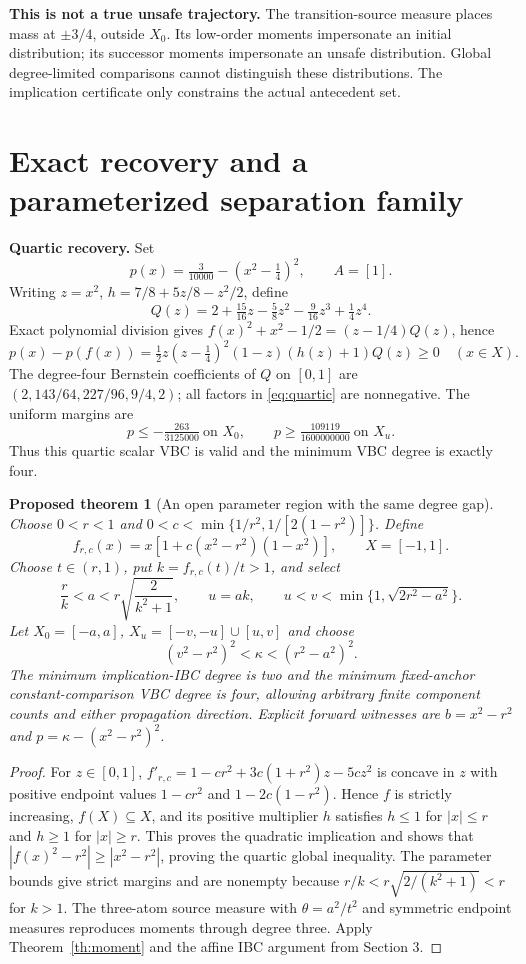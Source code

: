 \documentclass[10pt,letterpaper]{article}
\newtheorem{theorem}{Proposed theorem}
\begin{document}
\textbf{This is not a true unsafe trajectory.} The transition-source measure places mass at $\pm3/4$, outside $X_0$. Its low-order moments impersonate an initial distribution; its successor moments impersonate an unsafe distribution. Global degree-limited comparisons cannot distinguish these distributions. The implication certificate only constrains the actual antecedent set.

\newpage
\section{Exact recovery and a parameterized separation family}
\textbf{Quartic recovery.} Set
\[
 p(x)=\tfrac{3}{10000}-(x^2-\tfrac14)^2,\qquad A=[1].
\]
Writing $z=x^2$, $h=7/8+5z/8-z^2/2$, define
\[
 Q(z)=2+\tfrac{15}{16}z-\tfrac58z^2-\tfrac9{16}z^3+\tfrac14z^4.
\]
Exact polynomial division gives $f(x)^2+x^2-1/2=(z-1/4)Q(z)$, hence
\begin{equation}\label{eq:quartic}
 p(x)-p(f(x))=\tfrac12 z(z-\tfrac14)^2(1-z)(h(z)+1)Q(z)\geq0\quad(x\in X).
\end{equation}
The degree-four Bernstein coefficients of $Q$ on $[0,1]$ are $(2,143/64,227/96,9/4,2)$; all factors in \eqref{eq:quartic} are nonnegative. The uniform margins are
\[
 p\leq-\tfrac{263}{3125000}\ \text{on }X_0,\qquad
 p\geq\tfrac{109119}{1600000000}\ \text{on }X_u.
\]
Thus this quartic scalar VBC is valid and the minimum VBC degree is exactly four.

\begin{theorem}[An open parameter region with the same degree gap]\label{th:family}
Choose $0<r<1$ and $0<c<\min\{1/r^2,1/[2(1-r^2)]\}$. Define
\[
 f_{r,c}(x)=x[1+c(x^2-r^2)(1-x^2)],\qquad X=[-1,1].
\]
Choose $t\in(r,1)$, put $k=f_{r,c}(t)/t>1$, and select
\[
 \frac r k<a<r\sqrt{\frac{2}{k^2+1}},\qquad
 u=ak,\qquad u<v<\min\{1,\sqrt{2r^2-a^2}\}.
\]
Let $X_0=[-a,a]$, $X_u=[-v,-u]\cup[u,v]$ and choose
\[
 (v^2-r^2)^2<\kappa<(r^2-a^2)^2.
\]
The minimum implication-IBC degree is two and the minimum fixed-anchor constant-comparison VBC degree is four, allowing arbitrary finite component counts and either propagation direction. Explicit forward witnesses are $b=x^2-r^2$ and $p=\kappa-(x^2-r^2)^2$.
\end{theorem}
\begin{proof}
For $z\in[0,1]$, $f'_{r,c}=1-cr^2+3c(1+r^2)z-5cz^2$ is concave in $z$ with positive endpoint values $1-cr^2$ and $1-2c(1-r^2)$. Hence $f$ is strictly increasing, $f(X)\subseteq X$, and its positive multiplier $h$ satisfies $h\leq1$ for $|x|\leq r$ and $h\geq1$ for $|x|\geq r$. This proves the quadratic implication and shows that $|f(x)^2-r^2|\geq|x^2-r^2|$, proving the quartic global inequality. The parameter bounds give strict margins and are nonempty because $r/k<r\sqrt{2/(k^2+1)}<r$ for $k>1$. The three-atom source measure with $\theta=a^2/t^2$ and symmetric endpoint measures reproduces moments through degree three. Apply Theorem~\ref{th:moment} and the affine IBC argument from Section 3.
\end{proof}
\end{document}
